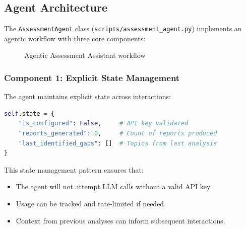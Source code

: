 \documentclass[12pt, a4paper]{article}
\begin{document}
\subsection{Agent Architecture}

The \texttt{AssessmentAgent} class (\texttt{scripts/assessment\_agent.py}) implements an agentic workflow with three core components:

\begin{figure}[H]
\centering
{}
\caption{Agentic Assessment Assistant workflow}
\label{fig:agent-arch}
\end{figure}

\subsubsection{Component 1: Explicit State Management}

The agent maintains explicit state across interactions:

\begin{lstlisting}[language=Python, caption={Agent state initialisation}]
self.state = {
    "is_configured": False,     # API key validated
    "reports_generated": 0,     # Count of reports produced
    "last_identified_gaps": []  # Topics from last analysis
}
\end{lstlisting}

This state management pattern ensures that:
\begin{itemize}[noitemsep]
    \item The agent will not attempt LLM calls without a valid API key.
    \item Usage can be tracked and rate-limited if needed.
    \item Context from previous analyses can inform subsequent interactions.
\end{itemize}
\end{document}
